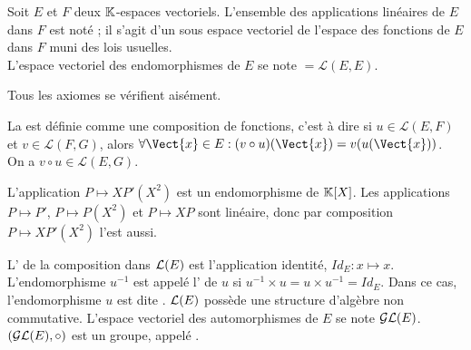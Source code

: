 \documentclass{book}
\begin{document}
\begin{DefinitionProposition}
Soit $E$ et $F$ deux $\mathbb{K} $-espaces vectoriels.
L'ensemble des applications linéaires de $E$ dans $F$ est noté  ;
il s'agit d'un sous espace vectoriel de l'espace des fonctions de $E$ dans $F$ muni des lois usuelles.\\
L'espace vectoriel des endomorphismes de $E$ se note $= \mathcal{L}(E,E)$.
\end{DefinitionProposition}
\begin{Demonstration}
Tous les axiomes se vérifient aisément.  
\end{Demonstration}
\begin{Definition}
La  est définie comme une composition de fonctions, c'est à dire si $u\in\mathcal{L}(E,F)$ et $v\in\mathcal{L}(F,G) $,
 alors  $\forall \Vect{x} \in E : (v\circ u)(\Vect{x})=v(u(\Vect{x}))$.\\
On a $v\circ u\in \mathcal{L}(E,G).$
 \end{Definition}
\begin{Exemple}
L'application $P\mapsto XP'(X^2)$ est un endomorphisme de $\mathbb{K}[X]$. Les applications $P\mapsto P'$, $P\mapsto P(X^2)$ et $P\mapsto XP$ sont linéaire, donc par composition  $P\mapsto XP'(X^2)$ l'est aussi.    
\end{Exemple} 
\begin{Definition}
L' de la composition dans $\mathcal{L}(E)$ est l'application identité, $Id_{E}:x\mapsto x$. L'endomorphisme $u^{-1}$ est appelé l'  de $u$ si $ u^{-1}×u=u×u^{-1}=Id_{E}$. Dans ce cas, l'endomorphisme $u$ est dite .  $\mathcal{L}(E)$ possède une structure d'algèbre non commutative. L'espace vectoriel des automorphismes de $E$ se note $ \mathcal{GL}(E)$.   $(\mathcal{GL}(E),\circ)$ est un groupe, appelé .
\end{Definition}
\end{document}
